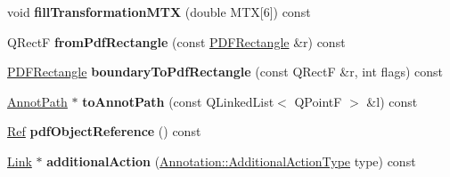\begin{DoxyCompactItemize}
void {\bfseries fill\+Transformation\+M\+TX} (double M\+TX\mbox{[}6\mbox{]}) const
\item 
\mbox{\label{class_poppler_1_1_annotation_private_a7bc9c2f7fd0a062cb6f39d52a9063af1}} 
Q\+RectF {\bfseries from\+Pdf\+Rectangle} (const \hyperlink{class_p_d_f_rectangle}{P\+D\+F\+Rectangle} \&r) const
\item 
\mbox{\label{class_poppler_1_1_annotation_private_acd615ffe1cc87884b31c161e2786b0ac}} 
\hyperlink{class_p_d_f_rectangle}{P\+D\+F\+Rectangle} {\bfseries boundary\+To\+Pdf\+Rectangle} (const Q\+RectF \&r, int flags) const
\item 
\mbox{\label{class_poppler_1_1_annotation_private_a09ab5095714f8d844ec7ea7fe201d251}} 
\hyperlink{class_annot_path}{Annot\+Path} $\ast$ {\bfseries to\+Annot\+Path} (const Q\+Linked\+List$<$ Q\+PointF $>$ \&l) const
\item 
\mbox{\label{class_poppler_1_1_annotation_private_a9d8c1a6e02249cf5dd220b7741dc45c0}} 
\hyperlink{struct_ref}{Ref} {\bfseries pdf\+Object\+Reference} () const
\item 
\mbox{\label{class_poppler_1_1_annotation_private_a9b2c8f724130e29960151848ecfd005e}} 
\hyperlink{class_poppler_1_1_link}{Link} $\ast$ {\bfseries additional\+Action} (\hyperlink{class_poppler_1_1_annotation_adab1fa85588b8f9fcdf20cdf37c1be97}{Annotation\+::\+Additional\+Action\+Type} type) const
\end{DoxyCompactItemize}
